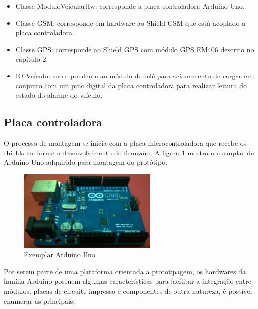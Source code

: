 \begin{itemize}
	\item Classe ModuloVeicularHw: corresponde a placa controladora Arduino Uno.
	\item Classe GSM: corresponde em hardware ao Shield GSM que está acoplado a placa controladora.
	\item Classe GPS: corresponde ao Shield GPS com módulo GPS EM406 descrito no capítulo 2.
	\item IO Veículo: correspondente ao módulo de relé para acionamento de cargas em conjunto com um pino digital da placa controladora para realizar leitura do estado do alarme do veículo.
\end{itemize}

\subsection{Placa controladora}

O processo de montagem se inicia com a placa microcontroladora que recebe os shields conforme o desenvolvimento do firmware. A figura \ref{fig:arduinounoimpl} mostra o exemplar de Arduino Uno adquirido para montagem do protótipo.

\begin{figure}[!htb]
	\centering
	\includegraphics[width=0.6\textwidth]{figures/arduinoUnoReal.jpg}
	\caption{Exemplar Arduino Uno}
	\label{fig:arduinounoimpl}
\end{figure}

Por serem parte de uma plataforma orientada a prototipagem, os hardwares da família Arduino possuem algumas características para facilitar a integração entre módulos, placas de circuito impresso e componentes de outra natureza, é possível enumerar as principais:

